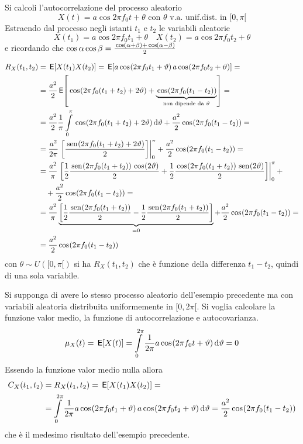\begin{esempio}\label{es:oscillatore_non_stazionario}
Si calcoli l'autocorrelazione del processo aleatorio\[X(t)=a\cos{2\pi f_0 t+\theta}\text{ con }\theta\text{ v.a. unif.dist. in }[0,\pi[\]
Estraendo dal processo negli istanti $t_1$ e $t_2$ le variabili aleatorie
\[X(t_1)=a\cos{2\pi f_0 t_1+\theta}\quad X(t_2)=a\cos{2\pi f_0 t_2+\theta}\]
e ricordando che $\operatorname{cos}\alpha\operatorname{cos}\beta=\frac{\,{\operatorname{cos}}^{}\!\left({\alpha+\beta}\right)+\,{\operatorname{cos}}^{}\!\left({\alpha-\beta}\right)}{2}$

\begin{equation}\label{eq:autocorrelazione_oscillatore_non_stazionario}
\begin{split}R_X(t_1,t_2)&=\E{X(t_1)X(t_2)}=\E{a\cos{2\pi f_0 t_1+\theta}a\cos{2\pi f_0 t_2+\theta}}=\\
&=\frac{a^2}{2}\E{\cos{2\pi f_0(t_1+t_2)+2\theta}+\underbrace{\cos{2\pi f_0(t_1-t_2)}}_{\text{non dipende da $\theta$}}}=\\
&=\frac{a^2}{2}\frac{1}{\pi}\intd{0}{\pi}{\cos{2\pi f_0(t_1+t_2)+2\theta}}{\theta}+\frac{a^2}{2}\cos{2\pi f_0(t_1-t_2)}=\\
&=\frac{a^2}{2\pi}\bound{0}{\pi}{\frac{\sen{2\pi f_0(t_1+t_2)+2\theta}}{2}}+\frac{a^2}{2}\cos{2\pi f_0(t_1-t_2)}=\\
&=\frac{a^2}{\pi}\bound{0}{\pi}{\frac{1}{2}\frac{\sen{2\pi f_0(t_1+t_2)}\cos{2\theta}}{2}+\frac{1}{2}\frac{\cos{2\pi f_0(t_1+t_2)}\sen{2\theta}}{2}}+\\
&\quad+\frac{a^2}{2}\cos{2\pi f_0(t_1-t_2)}=\\
&=\frac{a^2}{\pi}\underbrace{\left[\frac{1}{2}\frac{\sen{2\pi f_0(t_1+t_2)}}{2}-\frac{1}{2}\frac{\sen{2\pi f_0(t_1+t_2)}}{2}\right]}_{=0}+\frac{a^2}{2}\cos{2\pi f_0(t_1-t_2)}=\\
&=\frac{a^2}{2}\cos{2\pi f_0(t_1-t_2)}
\end{split}\end{equation}
con $\theta\sim U([0,\pi[)$ si ha $R_X(t_1,t_2)$ che è funzione della differenza $t_1-t_2$, quindi di una sola variabile.
\end{esempio}
\begin{esempio}\label{es:oscillatore_stazionario}
Si supponga di avere lo stesso processo aleatorio dell'esempio precedente ma con variabili aleatoria distribuita uniformemente in $[0,2\pi[$. Si voglia calcolare la funzione valor medio, la funzione di autocorrelazione e autocovarianza.
\[\mu_X(t)=\,{\operatorname{\mathsf{E}}}\!\left[{X(t)}\right]=\int\limits_{0}^{2\pi}{\frac{1}{2\pi}a\,{\operatorname{cos}}^{}\!\left({2\pi f_0 t+\vartheta}\right)}{\,\mathop{}\!\mathrm{d}{\vartheta}}=0\]
Essendo la funzione valor medio nulla allora
\begin{equation}\label{eq:autocorrelazione_oscillatore_stazionario}
\begin{split}C_X(t_1,t_2)&=R_X(t_1,t_2)=\,{\operatorname{\mathsf{E}}}\!\left[{X(t_1)X(t_2)}\right]=\\&=\int\limits_{0}^{2\pi}{\frac{1}{2\pi}a\,{\operatorname{cos}}^{}\!\left({2\pi f_0 t_1+\vartheta}\right)a\,{\operatorname{cos}}^{}\!\left({2\pi f_0 t_2+\vartheta}\right)}{\,\mathop{}\!\mathrm{d}{\vartheta}}=\frac{a^2}{2}\,{\operatorname{cos}}^{}\!\left({2\pi f_0(t_1-t_2)}\right)\end{split}\end{equation}
che è il medesimo risultato dell'esempio precedente.
\end{esempio}

